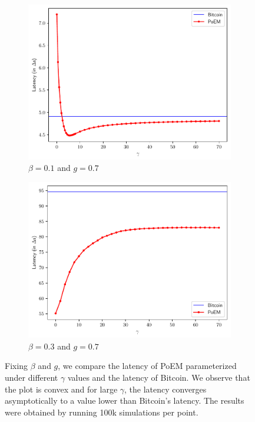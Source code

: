 \begin{figure}[h]
    \centering
    \begin{subfigure}{0.48\textwidth}
    \centering
    \includegraphics[width = \textwidth]{figures/gamma_latency_0.1.pdf}
    \caption{$\beta = 0.1$ and $g = 0.7$}
    \label{fig:gamma_latency_0.1}
    \end{subfigure}
    \begin{subfigure}{0.48\textwidth}
    \centering
    \includegraphics[width = \textwidth]{figures/gamma_latency_0.3.pdf}
    \caption{$\beta = 0.3$ and $g = 0.7$}
    \label{fig:gamma_latency_0.3}
    \end{subfigure}

  \caption{Fixing $\beta$ and $g$, we compare the latency of PoEM parameterized under different $\gamma$ values
          and the latency of Bitcoin. We observe that the plot is convex and for large $\gamma$, the latency
          converges asymptotically to a value lower than Bitcoin's latency. The results were obtained by running 100k simulations per point.}
    \label{fig:gamma_latency}
\end{figure}